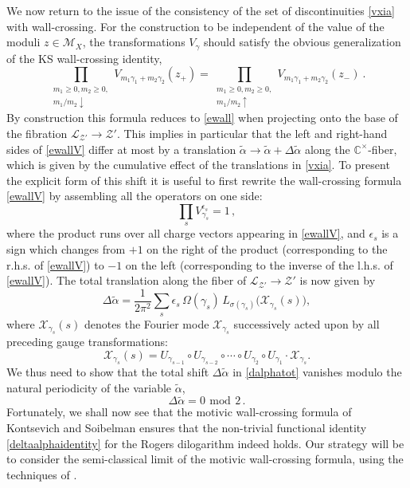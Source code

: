 \documentclass[12pt,reqno]{article}
\numberwithin{equation}{section}
\newcommand{\be}{\begin{equation}}
\newcommand{\ee}{\end{equation}}
\def\eps{\varepsilon}
\newcommand{\cM}{\mathcal{M}}
\newcommand{\cX}{\mathcal{X}}
\newcommand{\unit}{{\mathrm{1}}}
\newcommand{\cZ}{\mathcal{Z}}
\newcommand{\lb}{\mathscr{L}}
\newcommand{\ctg}{{V}_\gamma}
\def\talp{\tilde\alpha}
\def\eps{\epsilon}
\def\ind{s}
\def\pcZ{\cZ'}
\numberwithin{equation}{section}
\begin{document}
We now return to the issue of the consistency of the  set of discontinuities
 \eqref{vxia} with wall-crossing. For the
construction to be independent of the value of the moduli $z\in \cM_X$, the
transformations $\ctg$ should satisfy  the obvious generalization of the KS wall-crossing identity,
\be
\label{ewallV}
\prod_{\substack{m_1\geq 0,m_2\geq 0, \\ m_1/m_2\downarrow}}
V_{m_1\gamma_1+m_2\gamma_2}(z_+)
=
\prod_{\substack{m_1\geq 0,m_2\geq 0, \\ m_1/m_2\uparrow}}
V_{m_1\gamma_1+m_2\gamma_2}(z_-)\ .
\ee
By construction this formula reduces to \eqref{ewall} when projecting onto the base of the fibration $\lb_{{\pcZ}}\to \pcZ$.
This implies in particular that the left
and right-hand sides of \eqref{ewallV} differ at most by a translation $\talp\to\talp+\Delta\talp$ along the
$\mathbb{C}^{\times}$-fiber, which is given by the cumulative effect of the translations in
\eqref{vxia}. To present the explicit form of this shift it is useful to first rewrite the wall-crossing
formula \eqref{ewallV} by assembling all the operators on one side:
\be
\label{ewallV2}
\prod_{\ind} V_{\gamma_\ind }^{\eps_\ind} = \unit \, ,
\ee
where the product runs over all charge vectors appearing in \eqref{ewallV}, and $\eps_\ind$ is a sign which
changes from $+1$ on the right of the product (corresponding to the r.h.s.
of \eqref{ewallV}) to $-1$ on the left (corresponding to the inverse of the l.h.s. of \eqref{ewallV}).
The total translation along the fiber of $\lb_{\pcZ}\to \pcZ$ is now given by
\be
\label{dalphatot}
\Delta\talp =  \frac1{2\pi^2} \sum_{s} \epsilon_s \, \Omega(\gamma_{s} )\,
L_{\sigma(\gamma_{s} )} \big(  \cX_{\gamma_s}(s)  \big) ,
\ee
where $\cX_{\gamma_{s}}(s)$ denotes the Fourier
mode $\cX_{\gamma_s}$  successively acted upon by all preceding gauge transformations:
\be
\cX_{\gamma_s}(s)= U_{\gamma_{s-1}}\circ U_{\gamma_{s-2}}\circ
\cdots \circ U_{\gamma_2}\circ U_{\gamma_1}\cdot \cX_{\gamma_s}.
\ee
We thus need to show that the total shift $\Delta\talp$ in \eqref{dalphatot} vanishes
 modulo the natural periodicity of the variable $\talp$,
\be
\Delta\talp = 0 \ \, \text{mod}\ \, 2\, .
\label{deltaalphaidentity}
\ee
Fortunately, we shall now see that  the  motivic wall-crossing formula of Kontsevich and Soibelman
\cite{ks} ensures that the non-trivial functional identity \eqref{deltaalphaidentity}
for the Rogers dilogarithm indeed holds. Our strategy will be to consider
the semi-classical limit of the motivic wall-crossing formula,
using the techniques of \cite{Faddeev:1993rs,Kashaev:2011}.
\end{document}
